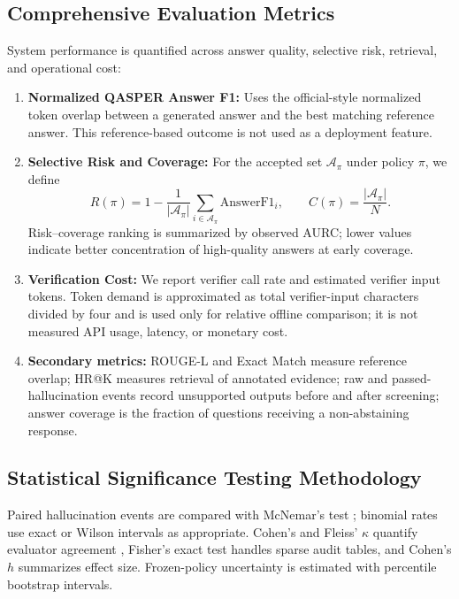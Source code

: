 \documentclass[smallextended]{svjour3}
\begin{document}
\subsection{Comprehensive Evaluation Metrics}
\label{subsec:metrics}
System performance is quantified across answer quality, selective risk, retrieval, and operational cost:

\begin{enumerate}
    \item \textbf{Normalized QASPER Answer F1:} Uses the official-style normalized token overlap between a generated answer and the best matching reference answer. This reference-based outcome is not used as a deployment feature.
    \item \textbf{Selective Risk and Coverage:} For the accepted set $\mathcal{A}_{\pi}$ under policy $\pi$, we define
    \begin{equation}
    R(\pi)=1-\frac{1}{|\mathcal{A}_{\pi}|}\sum_{i\in\mathcal{A}_{\pi}}\mathrm{AnswerF1}_i,
    \qquad
    C(\pi)=\frac{|\mathcal{A}_{\pi}|}{N}.
    \label{eq:selective_risk}
    \end{equation}
    Risk--coverage ranking is summarized by observed AURC; lower values indicate better concentration of high-quality answers at early coverage.
    \item \textbf{Verification Cost:} We report verifier call rate and estimated verifier input tokens. Token demand is approximated as total verifier-input characters divided by four and is used only for relative offline comparison; it is not measured API usage, latency, or monetary cost.
    \item \textbf{Secondary metrics:} ROUGE-L and Exact Match measure reference overlap; HR@K measures retrieval of annotated evidence; raw and passed-hallucination events record unsupported outputs before and after screening; answer coverage is the fraction of questions receiving a non-abstaining response.
\end{enumerate}

\subsection{Statistical Significance Testing Methodology}
\label{subsec:statistics}
Paired hallucination events are compared with McNemar's test \citep{mcnemar1947note}; binomial rates use exact or Wilson intervals as appropriate. Cohen's and Fleiss' $\kappa$ quantify evaluator agreement \citep{cohen1960coefficient}, Fisher's exact test handles sparse audit tables, and Cohen's $h$ summarizes effect size. Frozen-policy uncertainty is estimated with percentile bootstrap intervals.
\end{document}
